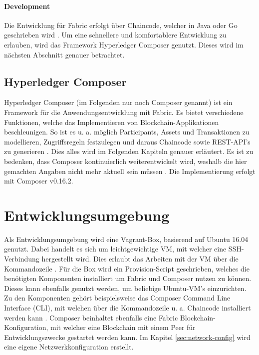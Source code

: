 \paragraph{Development}
Die Entwicklung für Fabric erfolgt über Chaincode, welcher in Java oder Go geschrieben wird \cite{HyperledgerFabricTeamSDKsHyperledgerFabric}. Um eine schnellere und komfortablere Entwicklung zu erlauben, wird das Framework Hyperledger Composer genutzt. Dieses wird im nächsten Abschnitt genauer betrachtet.


\subsection{Hyperledger Composer}
Hyperledger Composer (im Folgenden nur noch Composer genannt) ist ein Framework für die Anwendungsentwicklung mit Fabric. Es bietet verschiedene Funktionen, welche das Implementieren von Blockchain-Applikationen beschleunigen. So ist es u. a. möglich Participants, Assets und Transaktionen zu modellieren, Zugriffsregeln festzulegen und daraus Chaincode sowie REST-API's zu generieren \cite{HyperledgerComposerTeamIntroductionHyperledgerComposer}. Dies alles wird im Folgenden Kapiteln genauer erläutert. Es ist zu bedenken, dass Composer kontinuierlich weiterentwickelt wird, weshalb die hier gemachten Angaben nicht mehr aktuell sein müssen \cite{HyperledgerComposerTeamHyperledgerComposerReleases2018}. Die Implementierung erfolgt mit Composer v0.16.2.

\section{Entwicklungsumgebung}
Als Entwicklungsumgebung wird eine Vagrant-Box, basierend auf Ubuntu 16.04 genutzt. Dabei handelt es sich um leichtgewichtige VM, mit welcher eine SSH-Verbindung hergestellt wird. Dies erlaubt das Arbeiten mit der VM über die Kommandozeile \cite{VagrantTeamVagrantHashiCorp}. Für die Box wird ein Provision-Script geschrieben, welches die benötigten Komponenten installiert um Fabric und Composer nutzen zu können. Dieses kann ebenfalls genutzt werden, um beliebige Ubuntu-VM's einzurichten. Zu den Komponenten gehört beispielsweise das Composer Command Line Interface (CLI), mit welchen über die Kommandozeile u. a. Chaincode installiert werden kann \cite{HyperledgerComposerTeamDevelopmentEnvironmentHyperledger}. Composer beinhaltet ebenfalls eine Fabric Blockchain-Konfiguration, mit welcher eine Blockchain mit einem Peer für Entwicklungszwecke gestartet werden kann. Im Kapitel \ref{sec:network-config} wird eine eigene Netzwerkkonfiguration erstellt.


